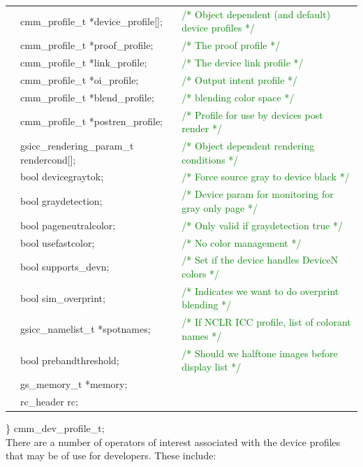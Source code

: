 \documentclass[12pt,notitlepage]{article}
\begin{document}
\begin{tabular}{lll}
 & cmm\_profile\_t  *device\_profile[]; & \textcolor{green}{/* Object dependent (and default) device profiles */}  \\
 & cmm\_profile\_t  *proof\_profile; & \textcolor{green}{/* The proof profile */}  \\
 & cmm\_profile\_t  *link\_profile; & \textcolor{green}{/* The device link profile */}  \\
 & cmm\_profile\_t  *oi\_profile; & \textcolor{green}{/* Output intent profile */}  \\
 & cmm\_profile\_t  *blend\_profile; & \textcolor{green}{/* blending color space */}  \\
 & cmm\_profile\_t  *postren\_profile; & \textcolor{green}{/* Profile for use by devices post render */}  \\
 & gsicc\_rendering\_param\_t rendercond[]; & \textcolor{green}{/* Object dependent rendering conditions */}  \\
 & bool devicegraytok;    &    \textcolor{green}{/* Force source gray to device black */}  \\
 & bool graydetection;    &    \textcolor{green}{/*  Device param for monitoring for gray only page */}  \\
 & bool pageneutralcolor;  &   \textcolor{green}{/* Only valid if graydetection true */}  \\
 & bool usefastcolor;     &   \textcolor{green}{/* No color management */} \\
 & bool supports\_devn;     &   \textcolor{green}{/* Set if the device handles DeviceN colors */} \\
 & bool sim\_overprint;  &   \textcolor{green}{/* Indicates we want to do overprint blending */} \\
 & gsicc\_namelist\_t  *spotnames; & \textcolor{green}{/* If NCLR ICC profile, list of colorant names */} \\
 & bool prebandthreshold;     &   \textcolor{green}{/* Should we halftone images before display list */} \\
  &       gs\_memory\_t *memory;    & \\
  &       rc\_header rc; &
\end{tabular}

\noindent  \}  cmm\_dev\_profile\_t;\\

There are a number of operators of interest associated with the device profiles that may be of use for developers.  These include:\\
\end{document}
